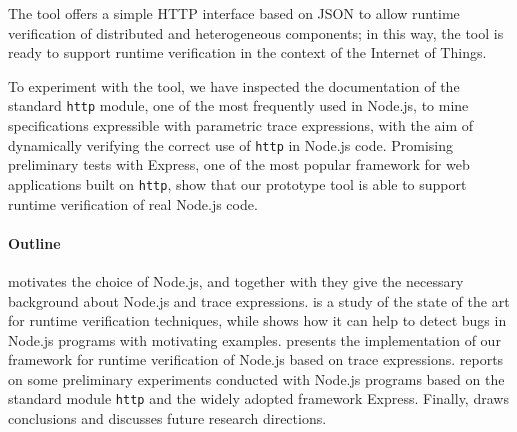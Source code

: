 The tool offers a simple HTTP interface based on JSON to allow runtime verification of
distributed and heterogeneous components; in this way, the tool is ready to
support runtime verification in the context of the Internet of Things.

To experiment with the tool, we have inspected the documentation of the standard \lstinline{http} module, one of the most frequently used 
in Node.js, to mine specifications expressible with parametric trace expressions, with the aim of dynamically verifying
the correct use of \lstinline{http} in Node.js code.
Promising preliminary tests with Express, one of the most popular framework for web applications built on \lstinline{http}, show
that our prototype tool is able to support runtime verification of real Node.js code.

\paragraph{Outline}
 motivates the choice of Node.js, and together with  they give the necessary background about Node.js and trace expressions.
 is a study of the state of the art for runtime verification techniques, while  shows how it can help to detect bugs in Node.js programs with motivating examples.
 presents the implementation of our framework for runtime verification of Node.js based on trace expressions.
 reports on some preliminary experiments conducted with Node.js programs based on the standard module
\lstinline{http} and the widely adopted framework Express.
Finally,  draws conclusions and discusses future research directions.
